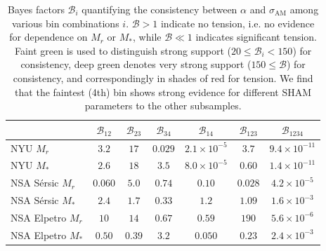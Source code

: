 \documentclass[usenatbib,useAMS]{mnras}
\newcommand{\scatter}{\ensuremath{\sigma_{\mathrm{AM}}}}
\newcommand{\Pstrong}{\cellcolor[HTML]{4AAE4A}} %
\newcommand{\nstrong}{\cellcolor[HTML]{EEA8A8}} %
\newcommand{\Nstrong}{\cellcolor[HTML]{D62728}} %
\begin{document}
\begin{table}
\setlength{\tabcolsep}{2.25pt}
\renewcommand{\arraystretch}{1.25}
\begin{tabular}{lcccccc}
 & $\mathcal{B}_{12}$ & $\mathcal{B}_{23}$ & $\mathcal{B}_{34}$ & $\mathcal{B}_{14}$ & $\mathcal{B}_{123}$ & $\mathcal{B}_{1234}$ \\
 \hline
\ac{NYU} $M_r$          & $3.2$ & $17$  & \nstrong $0.029$ & \Nstrong $2.1\times 10^{-5}$ & $3.7$ & \Nstrong $9.4 \times 10^{-11}$ \\
% 
\ac{NYU} $M_*$          & $2.6$ & $18$  & $3.5$   & \Nstrong $8.0\times 10^{-5}$ & $0.60$ & \Nstrong $1.4\times 10^{-11}$ \\
% 
\ac{NSA} S\'ersic $M_r$   & $0.060$ & $5.0$ & $0.74$ & $0.10$ & \nstrong $0.028$ & \Nstrong $4.2\times 10^{-5}$ \\
% 
\ac{NSA} S\'ersic $M_*$   & $2.4$ & $1.7$ & $0.33$ & $1.2$ & $1.09$ & \Nstrong $1.6 \times 10^{-3}$ \\
% 
\ac{NSA} Elpetro $M_r$  & $10$ & $14$   & $0.67$ &  $0.59$ & \Pstrong $190$ & \Nstrong $5.6\times 10^{-6}$ \\
% 
\ac{NSA} Elpetro $M_*$  & $0.50$ & $0.39$   & $3.2$ & \nstrong $0.050$ & $0.23$ &  \Nstrong $2.4\times 10^{-3}$\\
\hline
\end{tabular}
\caption{\label{tab:parameter_tension}
Bayes factors $\mathcal{B}_i$ quantifying the consistency between $\alpha$ and $\scatter$ among various bin combinations $i$. $\mathcal{B} > 1$ indicate no tension, i.e. no evidence for dependence on $M_r$ or $M_*$, while $\mathcal{B} \ll 1$ indicates significant tension. Faint green is used to distinguish strong support ($20 \leq \mathcal{B}_i < 150$) for consistency, deep green denotes very strong support ($150 \leq \mathcal{B}$) for consistency, and correspondingly in shades of red for tension. We find that the faintest (4th) bin shows strong evidence for different \ac{SHAM} parameters to the other subsamples.}
\end{table}
\end{document}
